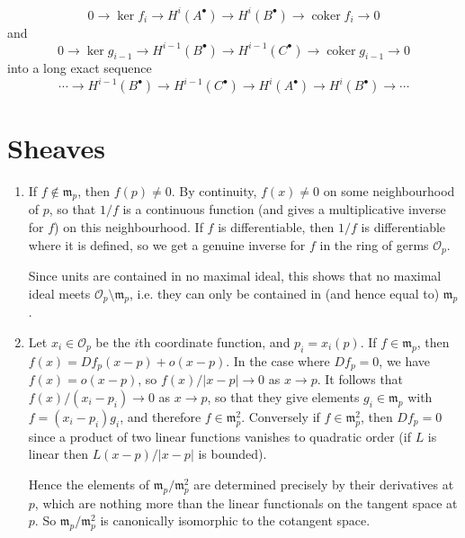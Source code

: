 \documentclass{report}
\newcommand{\m}{\mathfrak{m}}
\renewcommand{\O}{\mathscr{O}} %
\DeclareMathOperator{\coker}{coker}
\begin{document}
\begin{enumerate}[label=\textbf{1.7.\Alph*.}]
\begin{equation*}
		      0\to\ker f_i\to H^i(A^\bullet)\to H^i(B^\bullet)\to\coker f_i\to0
	      \end{equation*}
	      and
	      \begin{equation*}
		      0\to\ker g_{i-1}\to H^{i-1}(B^\bullet)\to H^{i-1}(C^\bullet)\to\coker g_{i-1}\to0
	      \end{equation*}
	      into a long exact sequence
	      \begin{equation*}
		      \cdots\to H^{i-1}(B^\bullet)\to H^{i-1}(C^\bullet)
		      \to H^i(A^\bullet)\to H^i(B^\bullet)\to\cdots
	      \end{equation*}
\end{enumerate}

\chapter{Sheaves}

\begin{enumerate}[label=\textbf{2.1.\Alph*.}]
	\item If $f\notin\m_p$, then $f(p)\ne0$. By continuity, $f(x)\ne0$ on some
	      neighbourhood of $p$, so that $1/f$ is a continuous function
	      (and gives a multiplicative inverse for $f$) on this neighbourhood. If
	      $f$ is differentiable, then $1/f$ is differentiable where it is defined,
	      so we get a genuine inverse for $f$ in the ring of germs $\O_p$.

	      Since units are contained in no maximal ideal, this shows that no
	      maximal ideal meets $\O_p\setminus\m_p$, i.e. they can only be contained
	      in (and hence equal to) $\m_p$.
	\item Let $x_i\in\O_p$ be the $i$th coordinate function, and $p_i=x_i(p)$.
	      If $f\in\m_p$, then $f(x)=Df_p(x-p) + o(x-p)$. In the case where
	      $Df_p=0$, we have $f(x)=o(x-p)$, so $f(x)/|x-p|\to0$ as $x\to p$. It
	      follows that $f(x)/(x_i-p_i)\to0$ as $x\to p$, so that they give
	      elements $g_i\in\m_p$ with $f=(x_i-p_i)g_i$, and therefore
	      $f\in\m_p^2$. Conversely if $f\in\m_p^2$, then $Df_p=0$ since a
	      product of two linear functions vanishes to quadratic order (if $L$ is
	      linear then $L(x-p)/|x-p|$ is bounded).

	      Hence the elements of $\m_p/\m_p^2$ are determined precisely by their
	      derivatives at $p$, which are nothing more than the linear
	      functionals on the tangent space at $p$. So $\m_p/\m_p^2$ is
	      canonically isomorphic to the cotangent space.
\end{enumerate}
\end{document}
